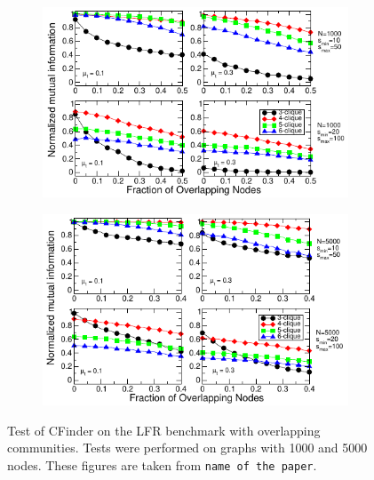 \newcommand{\cfinderwidth}{0.96\linewidth}
\begin{figure}
    \centering
    \begin{subfigure}{0.5\textwidth}
    \centering
    \includegraphics[width=\cfinderwidth]{lfrpaper/fig6.pdf}
    \end{subfigure}%
    \begin{subfigure}{0.5\textwidth}
    \centering
    \includegraphics[width=\cfinderwidth]{lfrpaper/fig7.pdf}
    \end{subfigure}%
    \caption{
        Test of CFinder on the LFR benchmark with overlapping communities.
        Tests were performed on graphs with 1000 and 5000 nodes.
        These figures are taken from \texttt{name of the paper}.
    }
\end{figure}








